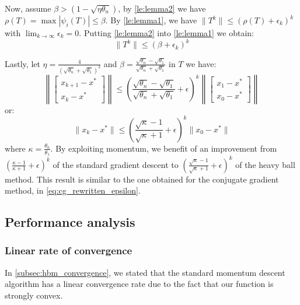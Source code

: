\noindent Now, assume $\beta>(1 - \sqrt{\eta \theta_n})$, by \cref{le:lemma2} we have $\rho(T) = \max{|\psi_i(T)|} \leq \beta$. By \cref{le:lemma1}, we have $\lVert T^k \rVert \leq (\rho(T) + \epsilon_k)^k$ with $\displaystyle \lim_{k \rightarrow \infty}{\epsilon_k = 0}$. Putting \cref{le:lemma2} into \cref{le:lemma1} we obtain:
\begin{equation}
    \lVert T^k \rVert \leq (\beta + \epsilon_k)^k
\end{equation}

\vspace{3mm}

\noindent Lastly, let $\eta = \frac{4}{(\sqrt{\theta_n}+\sqrt{\theta_1})^2}$ and $\beta = \frac{\sqrt{\theta_n} - \sqrt{\theta_1}}{\sqrt{\theta_n}+\sqrt{\theta_1}}$ in $T$ we have:
\begin{equation}
\left\lVert
\begin{bmatrix}
x_{k+1} - x^*\\
x_k - x^*
\end{bmatrix}
\right \rVert
\leq \left(\frac{\sqrt{\theta_n} - \sqrt{\theta_1}}{\sqrt{\theta_n}+\sqrt{\theta_1}} + \epsilon \right)^k
\left\lVert
\begin{bmatrix}
x_{1} - x^*\\
x_{0} - x^*
\end{bmatrix}
\right\rVert
\end{equation}
or:
\begin{equation}
    \lVert x_k - x^* \rVert \leq \left(\frac{\sqrt{\kappa} - 1}{\sqrt{\kappa}+1} + \epsilon \right)^k \lVert x_0 - x^* \rVert
\end{equation}
 where $\kappa = \frac{\theta_n}{\theta_1}$. By exploiting momentum, we benefit of an improvement from $ \left(\frac{\kappa - 1}{\kappa + 1} + \epsilon \right)^k$ of the standard gradient descent to $\left(\frac{\sqrt{\kappa} - 1}{\sqrt{\kappa}+1} + \epsilon \right)^k$ of the heavy ball method. This result is similar to the one obtained for the conjugate gradient method, in \eqref{eq:cg_rewritten_epsilon}.

\subsection{Performance analysis}

\subsubsection{Linear rate of convergence}
In \ref{subsec:hbm_convergence}, we stated that the standard momentum descent algorithm has a linear convergence rate due to the fact that our function is strongly convex.
\vspace{3mm}

